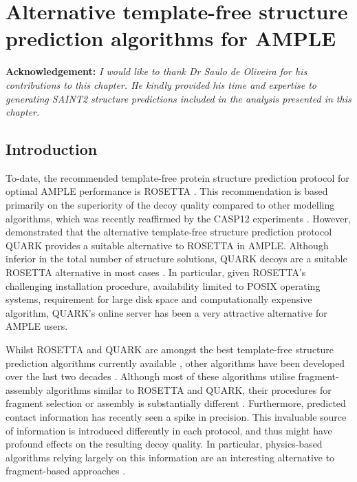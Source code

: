 \chapter{Alternative template-free structure prediction algorithms for AMPLE} \label{chap:alternate_abinitio_protocols}
\clearpage

\textbf{Acknowledgement: }\textit{I would like to thank Dr Saulo de Oliveira for his contributions to this chapter. He kindly provided his time and expertise to generating SAINT2 structure predictions included in the analysis presented in this chapter.}

\section{Introduction}
To-date, the recommended template-free protein structure prediction protocol for optimal AMPLE performance is ROSETTA \cite{Keegan2015-zb,Thomas2017-sh,Thomas2015-wu,Bibby2012-lm}. This recommendation is based primarily on the superiority of the decoy quality compared to other modelling algorithms, which was recently reaffirmed by the CASP12 experiments \cite{Abriata2018-lu,Ovchinnikov2018-wp}. However, \textcite{Keegan2015-zb} demonstrated that the alternative template-free structure prediction protocol QUARK provides a suitable alternative to ROSETTA in AMPLE. Although inferior in the total number of structure solutions, QUARK decoys are a suitable ROSETTA alternative in most cases \cite{Keegan2015-zb}. In particular, given ROSETTA's challenging installation procedure, availability limited to POSIX operating systems, requirement for large disk space and computationally expensive algorithm, QUARK's online server has been a very attractive alternative for AMPLE users.

Whilst ROSETTA and QUARK are amongst the best template-free structure prediction algorithms currently available \cite{Abriata2018-lu}, other algorithms have been developed over the last two decades \cite[e.g.,][]{Jones2001-mc,Ellis2010-zs,Adhikari2015-lb,Xu2012-jf,Marks2011-os,Wang2016-ar}. Although most of these algorithms utilise fragment-assembly algorithms similar to ROSETTA and QUARK, their procedures for fragment selection or assembly is substantially different \cite{Ellis2010-zs,Jones2001-mc}. Furthermore, predicted contact information has recently seen a spike in precision. This invaluable source of information is introduced differently in each protocol, and thus might have profound effects on the resulting decoy quality. In particular, physics-based algorithms relying largely on this information are an interesting alternative to fragment-based approaches \cite{Adhikari2015-lb,Marks2011-os,Wang2016-ar,Dos_Santos2018-lq}.

